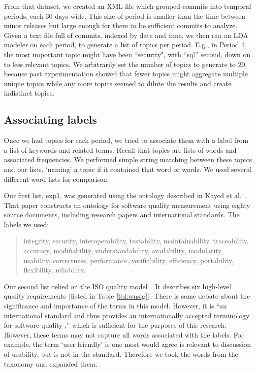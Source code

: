 \documentclass[10pt, conference, compsocconf]{IEEEtran}
\begin{document}
From that dataset, we created an XML file which grouped commits into temporal periods, each 30 days wide. This size of period is smaller than the time between minor releases but large enough for there to be sufficient commits to analyze. Given a text file full of commits, indexed by date and time, we then ran an LDA modeler on each period, to generate a list of topics per period. E.g., in Period 1, the most important topic might have been ``security", with ``sql'' second, down on to less relevant topics. We arbitrarily set the number of topics to generate to 20, because past experimentation showed that fewer topics might aggregate multiple unique topics while any more topics seemed to dilute the results and create indistinct topics.

\subsection{Associating labels}
Once we had topics for each period, we tried to associate them with a label from a list of keywords and related terms. Recall that topics are lists of words and associated frequencies. We performed simple string matching between these topics and our lists, `naming' a topic if it contained that word or words. We used several different word lists for comparison. 

Our first list, \textsf{exp1}, was generated using the ontology described in Kayed et al.~\cite{5072519}. That paper constructs an ontology for software quality measurement using eighty source documents, including research papers and international standards. The labels we used:
\begin{quotation}
\small \noindent \textsf{
integrity, security,
interoperability, testability, maintainability, traceability,
accuracy, modifiability, understandability, availability, modularity,
usability, correctness, performance, verifiability, efficiency,
portability, flexibility, reliability.
}
\end{quotation}

Our second list relied on the ISO quality model~\cite{iso9126}. It describes six high-level quality requirements (listed in Table \ref{tbl:wnsig}). There is some debate about the significance and importance of the terms in this model. However, it is ``an international standard and thus provides an internationally accepted terminology for software quality \cite[p. 58]{Bøegh2008},'' which is sufficient for the purposes of this research. However, these terms may not capture all words associated with the labels.  For example, the term ‘user friendly’ is one most would agree is relevant to discussion of usability, but is not in the standard. Therefore we took the words from the taxonomy and expanded them.
\end{document}
